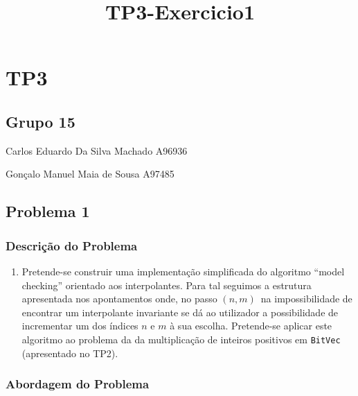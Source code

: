 \documentclass[11pt]{article}
\title{TP3-Exercicio1}
\providecommand{\tightlist}{%
      \setlength{\itemsep}{0pt}\setlength{\parskip}{0pt}}
\begin{document}
    
    \maketitle
    
    

    
    \hypertarget{tp3}{%
\section{TP3}\label{tp3}}

\hypertarget{grupo-15}{%
\subsection{Grupo 15}\label{grupo-15}}

Carlos Eduardo Da Silva Machado A96936

Gonçalo Manuel Maia de Sousa A97485

    \hypertarget{problema-1}{%
\subsection{Problema 1}\label{problema-1}}

    \hypertarget{descriuxe7uxe3o-do-problema}{%
\subsubsection{Descrição do
Problema}\label{descriuxe7uxe3o-do-problema}}

    \begin{enumerate}
\def\labelenumi{\arabic{enumi}.}
\tightlist
\item
  Pretende-se construir uma implementação simplificada do algoritmo
  ``model checking'' orientado aos interpolantes. Para tal seguimos a
  estrutura apresentada nos apontamentos onde, no passo \((n,m)\,\) na
  impossibilidade de encontrar um interpolante invariante se dá ao
  utilizador a possibilidade de incrementar um dos índices \(n\) e \(m\)
  à sua escolha. Pretende-se aplicar este algoritmo ao problema da da
  multiplicação de inteiros positivos em \texttt{BitVec} (apresentado no
  TP2).
\end{enumerate}

    \hypertarget{abordagem-do-problema}{%
\subsubsection{Abordagem do Problema}\label{abordagem-do-problema}}
\end{document}

